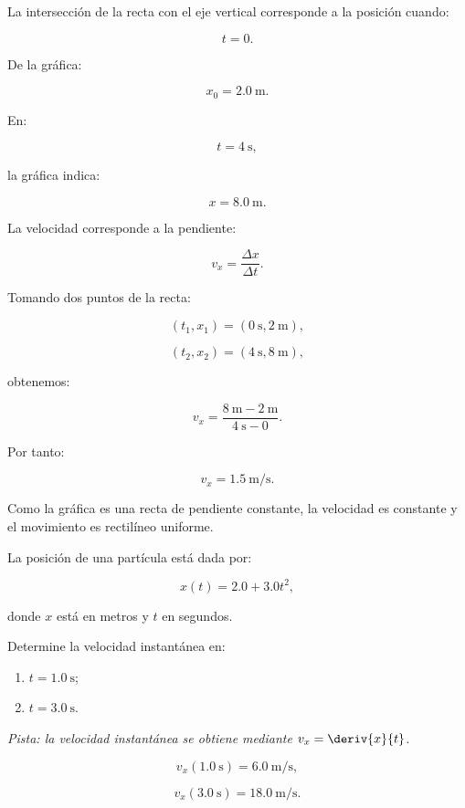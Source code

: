 \begin{explicacion}
La intersección de la recta con el eje vertical corresponde a la posición cuando:

\[ t=0. \]

De la gráfica:

\[ \boxed{x_0=\SI{2.0}{\meter}}. \]

En:

\[ t=\SI{4}{\second}, \]

la gráfica indica:

\[ \boxed{x=\SI{8.0}{\meter}}. \]

La velocidad corresponde a la pendiente:

\[ v_x=\frac{\Delta x}{\Delta t}. \]

Tomando dos puntos de la recta:

\[
(t_1,x_1)
=
(\SI{0}{\second},\SI{2}{\meter}),
\]

\[
(t_2,x_2)
=
(\SI{4}{\second},\SI{8}{\meter}),
\]

obtenemos:

\[
v_x
=
\frac{
\SI{8}{\meter}-\SI{2}{\meter}
}{
\SI{4}{\second}-0
}.
\]

Por tanto:

\[ \boxed{v_x=\SI{1.5}{\meter\per\second}}. \]

Como la gráfica es una recta de pendiente constante, la velocidad es constante y el movimiento es rectilíneo uniforme.
\end{explicacion}


\begin{ejercicio}
La posición de una partícula está dada por:

\[ x(t)=2.0+3.0t^2, \]

donde \(x\) está en metros y \(t\) en segundos.

Determine la velocidad instantánea en:

\begin{enumerate}[label=\alph*)]
    \item \(t=\SI{1.0}{\second}\);
    \item \(t=\SI{3.0}{\second}\).
\end{enumerate}

\textit{Pista: la velocidad instantánea se obtiene mediante \(v_x=\deriv{x}{t}\).}
\end{ejercicio}

\begin{respuesta}
\[
v_x(\SI{1.0}{\second})=\SI{6.0}{\meter\per\second},
\]

\[
v_x(\SI{3.0}{\second})=\SI{18.0}{\meter\per\second}.
\]
\end{respuesta}

